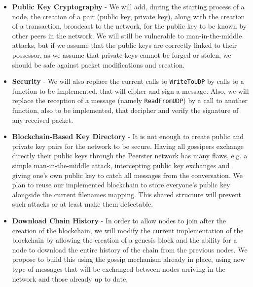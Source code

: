 \documentclass[11pt, a4paper]{article}
\begin{document}
        \begin{itemize}

        \item \textbf{Public Key Cryptography} -
        We will add, during the starting process of a node, the creation of a pair (public key, private key), along with the creation of a transaction, broadcast to the network, for the public key to be known by other peers in the network.
        We will still be vulnerable to man-in-the-middle attacks, but if we assume that the public keys are correctly linked to their possessor, as we assume that private keys cannot be forged or stolen, we should be safe against packet modifications and creation.

        \item \textbf{Security} - We will also replace the current calls to \texttt{WriteToUDP} by calls to a function to be implemented, that will cipher and sign a message. Also, we will replace the reception of a message (namely \texttt{ReadFromUDP}) by a call to another function, also to be implemented, that decipher and verify the signature of any received packet.

        \item \textbf{Blockchain-Based Key Directory} -
        It is not enough to create public and private key pairs for the network to be secure.
        Having all gossipers exchange directly their public keys through the Peerster network has many flaws, e.g. a simple man-in-the-middle attack, intercepting public key exchanges and giving one's own public key to catch all messages from the conversation.
        We plan to reuse our implemented blockchain to store everyone's public key alongside the current filenames mapping. This shared structure will prevent such attacks or at least make them detectable.

        \item \textbf{Download Chain History} -
        In order to allow nodes to join after the creation of the blockchain, we will modify the current implementation of the blockchain by allowing the creation of a genesis block and the ability for a node to download the entire history of the chain from the previous nodes.
        We propose to build this using the gossip mechanism already in place, using new type of messages that will be exchanged between nodes arriving in the network and those already up to date.


\end{itemize}
\end{document}
